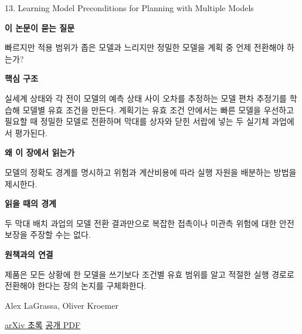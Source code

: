 \documentclass[11pt,openany]{book}
\begin{document}
\begin{termcard}{13. Learning Model Preconditions for Planning with Multiple Models}

\par

\medskip

{\sffamily\bfseries\color{deepblue} 이 논문이 묻는 질문}\par

빠르지만 적용 범위가 좁은 모델과 느리지만 정밀한 모델을 계획 중 언제 전환해야 하는가?

\smallskip

{\sffamily\bfseries\color{deepblue} 핵심 구조}\par

실세계 상태와 각 전이 모델의 예측 상태 사이 오차를 추정하는 모델 편차 추정기를 학습해 모델별 유효 조건을 만든다. 계획기는 유효 조건 안에서는 빠른 모델을 우선하고 필요할 때 정밀한 모델로 전환하며 막대를 상자와 닫힌 서랍에 넣는 두 실기체 과업에서 평가된다.

\smallskip

{\sffamily\bfseries\color{deepblue} 왜 이 장에서 읽는가}\par

모델의 정확도 경계를 명시하고 위험과 계산비용에 따라 실행 자원을 배분하는 방법을 제시한다.

\smallskip

{\sffamily\bfseries\color{coral} 읽을 때의 경계}\par

두 막대 배치 과업의 모델 전환 결과만으로 복잡한 접촉이나 미관측 위험에 대한 안전 보장을 주장할 수는 없다.

\smallskip

{\sffamily\bfseries\color{teal} 원책과의 연결}\par

제품은 모든 상황에 한 모델을 쓰기보다 조건별 유효 범위를 알고 적절한 실행 경로로 전환해야 한다는 장의 논지를 구체화한다.

\medskip

{\footnotesize\color{muted} Alex LaGrassa, Oliver Kroemer\par

\href{https://arxiv.org/abs/2206.05573}{arXiv 초록} \quad \href{https://arxiv.org/pdf/2206.05573}{공개 PDF}\par}

\end{termcard}
\end{document}
